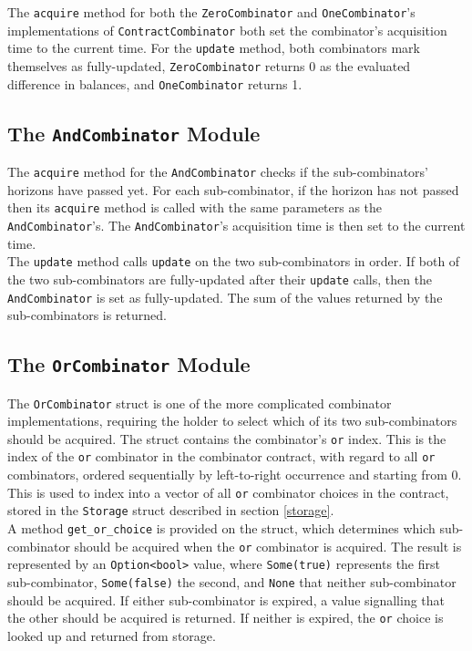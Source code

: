The \texttt{acquire} method for both the \texttt{ZeroCombinator} and \texttt{OneCombinator}'s implementations of \texttt{ContractCombinator} both set the combinator's acquisition time to the current time. For the \texttt{update} method, both combinators mark themselves as fully-updated, \texttt{ZeroCombinator} returns 0 as the evaluated difference in balances, and \texttt{OneCombinator} returns 1.


\subsection{The \texttt{AndCombinator} Module}

The \texttt{acquire} method for the \texttt{AndCombinator} checks if the sub-combinators' horizons have passed yet. For each sub-combinator, if the horizon has not passed then its \texttt{acquire} method is called with the same parameters as the \texttt{AndCombinator}'s. The \texttt{AndCombinator}'s acquisition time is then set to the current time. \\

The \texttt{update} method calls \texttt{update} on the two sub-combinators in order. If both of the two sub-combinators are fully-updated after their \texttt{update} calls, then the \texttt{AndCombinator} is set as fully-updated. The sum of the values returned by the sub-combinators is returned.


\subsection{The \texttt{OrCombinator} Module}

The \texttt{OrCombinator} struct is one of the more complicated combinator implementations, requiring the holder to select which of its two sub-combinators should be acquired. The struct contains the combinator's \texttt{or} index. This is the index of the \texttt{or} combinator in the combinator contract, with regard to all \texttt{or} combinators, ordered sequentially by left-to-right occurrence and starting from 0. This is used to index into a vector of all \texttt{or} combinator choices in the contract, stored in the \texttt{Storage} struct described in section \ref{storage}. \\

A method \texttt{get\_or\_choice} is provided on the struct, which determines which sub-combinator should be acquired when the \texttt{or} combinator is acquired. The result is represented by an \texttt{Option<bool>} value, where \texttt{Some(true)} represents the first sub-combinator, \texttt{Some(false)} the second, and \texttt{None} that neither sub-combinator should be acquired. If either sub-combinator is expired, a value signalling that the other should be acquired is returned. If neither is expired, the \texttt{or} choice is looked up and returned from storage. \\

